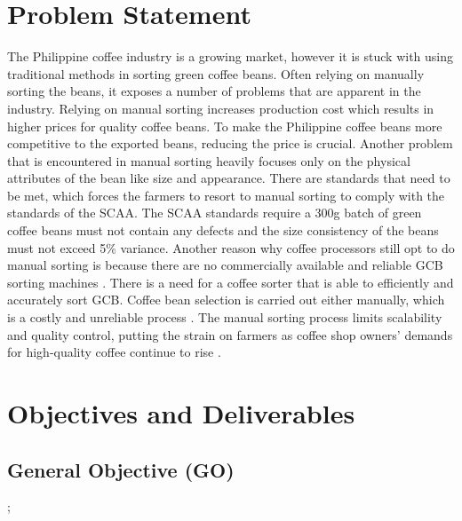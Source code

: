 \section{Problem Statement}
The Philippine coffee industry is a growing market, however it is stuck with using traditional methods in sorting green coffee beans. Often relying on manually sorting the beans, it exposes a number of problems that are apparent in the industry. Relying on manual sorting increases production cost which results in higher prices for quality coffee beans. To make the Philippine coffee beans more competitive to the exported beans, reducing the price is crucial. Another problem that is encountered in manual sorting heavily focuses only on the physical attributes of the bean like size and appearance. There are standards that need to be met, which forces the farmers to resort to manual sorting to comply with the standards of the SCAA. The SCAA standards require a 300g batch of green coffee beans must not contain any defects and the size consistency of the beans must not exceed 5\% variance. Another reason why coffee processors still opt to do manual sorting is because there are no commercially available and reliable GCB sorting machines \cite{Lualhati_Mariano_Torres_Fenol_2022}. There is a need for a coffee sorter that is able to efficiently and accurately sort GCB. Coffee bean selection is carried out either manually, which is a costly and unreliable process \cite{Santos_Rosas_Martins_Araújo_Viana_Gonçalves_2020}. The manual sorting process limits scalability and quality control, putting the strain on farmers as coffee shop owners' demands for high-quality coffee continue to rise \cite{Lualhati_Mariano_Torres_Fenol_2022}.   	 	 

\section{Objectives and Deliverables}

\subsection{General Objective (GO)}
 ;

